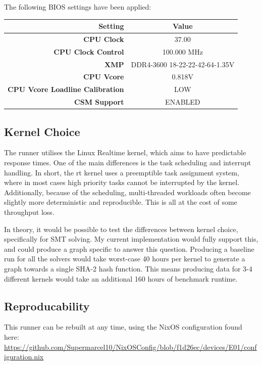 \documentclass[a4paper]{report}
\begin{document}
The following BIOS settings have been applied:
\begin{center}
	\begin{tabular}{|r|c|}
		\hline
		\textbf{Setting} & \textbf{Value} \\
		\hline
		\textbf{CPU Clock} & 37.00 \\
		\textbf{CPU Clock Control} & 100.000 MHz \\
		\textbf{XMP} & DDR4-3600 18-22-22-42-64-1.35V \\
		\textbf{CPU Vcore} & 0.818V \\
		\textbf{CPU Vcore Loadline Calibration} & LOW \\
		\textbf{CSM Support} & ENABLED \\
		\hline
	\end{tabular}
\end{center}

\subsection{Kernel Choice}
\label{ssec:kernel-choice}
The runner utilises the Linux Realtime kernel, which aims to have predictable response times.
One of the main differences is the task scheduling and interrupt handling.
In short, the rt kernel uses a preemptible task assignment system, where in most cases high priority tasks cannot be interrupted by the kernel.
Additionally, because of the scheduling, multi-threaded workloads often become slightly more deterministic and reproducible.
This is all at the cost of some throughput loss.

In theory, it would be possible to test the differences between kernel choice, specifically for SMT solving.
My current implementation would fully support this, and could produce a graph specific to answer this question.
Producing a baseline run for all the solvers would take worst-case 40 hours per kernel to generate a graph towards a single SHA-2 hash function.
This means producing data for 3-4 different kernels would take an additional 160 hours of benchmark runtime.

\subsection{Reproducability}
This runner can be rebuilt at any time, using the NixOS configuration found here: \\
\url{https://github.com/Supermarcel10/NixOSConfig/blob/f1d26ec/devices/E01/configuration.nix}
\end{document}
